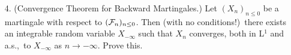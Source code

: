 \begin{enumerate}

\item[4.] (Convergence Theorem for Backward Martingales.)  Let $(X_n)_{n
\leq 0}$ be a martingale with respect to $({\cal F}_n)_{n \leq 0}$.  Then (with no
conditions!)\ there exists an integrable random variable $X_{- \infty}$ such
that $X_n$ converges, both in L$^1$ and a.s.,\ to $X_{- \infty}$ as $n \to -
\infty$.  Prove this.

\end{enumerate}
























